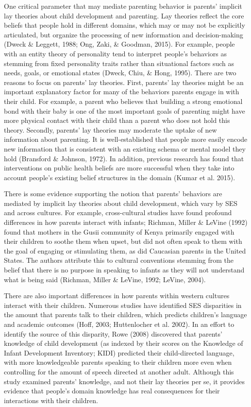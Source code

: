 \documentclass[10pt, letterpaper]{article}
\begin{document}
One critical parameter that may mediate parenting behavior is parents'
implicit lay theories about child development and parenting. Lay
theories reflect the core beliefs that people hold in different domains,
which may or may not be explicitly articulated, but organize the
processing of new information and decision-making (Dweck \& Leggett,
1988; Ong, Zaki, \& Goodman, 2015). For example, people with an entity
theory of personality tend to interpret people's behaviors as stemming
from fixed personality traits rather than situational factors such as
needs, goals, or emotional states (Dweck, Chiu, \& Hong, 1995). There
are two reasons to focus on parents' lay theories. First, parents' lay
theories might be an important explanatory factor for many of the
behaviors parents engage in with their child. For example, a parent who
believes that building a strong emotional bond with their baby is one of
the most important goals of parenting might have more physical contact
with their child than a parent who does not hold this theory. Secondly,
parents' lay theories may moderate the uptake of new information about
parenting. It is well-established that people more easily encode new
information that is consistent with an existing schema or mental model
they hold (Bransford \& Johnson, 1972). In addition, previous research
has found that interventions on public health beliefs are more
successful when they take into account people's existing belief
structures in the domain (Kumar et al. 2015).

There is some evidence supporting the notion that parents' behaviors are
mediated by implicit lay theories about child development, which vary by
SES and across cultures. For example, cross-cultural studies have found
profound differences in how parents interact with infants; Richman,
Miller \& LeVine (1992) found that mothers in the Gusii community of
Kenya primarily engaged with their children to soothe them when upset,
but did not often speak to them with the goal of engaging or stimulating
them, as did Caucasian parents in the United States. The authors
attribute this to cultural conventions stemming from the belief that
there is no purpose in speaking to infants as they will not understand
what is being said (Richman, Miller \& LeVine, 1992; LeVine, 2004).

There are also important differences in how parents within western
cultures interact with their children. Numerous studies have identified
SES disparities in the amount that parents talk to their children, which
predicts children's language and academic outcomes (Hoff, 2003;
Huttenlocher et al. 2002). In an effort to identify the source of this
disparity, Rowe (2008) discovered that parents' knowledge of child
development (as indexed by their scores on the Knowledge of Infant
Development Inventory; KIDI) predicted their child-directed language,
with more knowledgeable parents speaking to their children more even
when controlling for the amount of speech directed at another adult.
Although this study examined parents' knowledge, and not their lay
theories per se, it provides evidence that people's domain knowledge has
real consequences for their interactions with their children.
\end{document}
